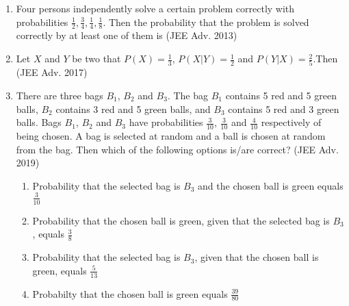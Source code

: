 \documentclass[journal,,12pt,twocolumn]{IEEEtran}
\theoremstyle{remark}
\begin{document}
\begin{enumerate}
\begin{enumerate}
        \end{enumerate}
        \item Four persons independently solve a certain problem correctly with probabilities $\frac{1}{2},\frac{3}{4},\frac{1}{4},\frac{1}{8}$. Then the probability that the problem is solved correctly by at least one of them is 
        \hfill{(JEE Adv. 2013)}
        \begin{enumerate}
        \end{enumerate}
\item Let $X$ and $Y$ be two that $P(X)=\frac{1}{3}$, $P(X|Y)=\frac{1}{2}$ and $P(Y|X)=\frac{2}{5}$.Then 
        \hfill{(JEE Adv. 2017)}
        \begin{enumerate}
        \end{enumerate}
    \item There are three bags $B_1$, $B_2$ and $B_3$. The bag $B_1$ contains 5 red and 5 green balls, $B_2$ contains 3 red and 5 green balls, and $B_3$ contains 5 red and 3 green balls. Bags $B_1$, $B_2$ and $B_3$ have probabilities $\frac{3}{10}$, $\frac{3}{10}$ and $\frac{4}{10}$ respectively of being chosen. A bag is selected at random and a ball is chosen at random from the bag. Then which of the following options is/are correct?
    \hfill{(JEE Adv. 2019)}
    \begin{enumerate}
    
        \item Probability that the selected bag is $B_3$ and the chosen ball is green equals $\frac{3}{10}$
        \item Probability that the chosen ball is green, given that the selected bag is $B_3$, equals $\frac{3}{8}$
        \item Probability that the selected bag is $B_3$, given that the chosen ball is green, equals $\frac{5}{13}$
        \item Probabilty that the chosen ball is green equals $\frac{39}{80}$
       \end{enumerate}
       \end{enumerate}
\end{document}
